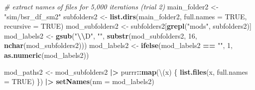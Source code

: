 \documentclass[12pt, twoside]{amherstthesis}
\newenvironment{Shaded}{\begin{snugshade}}{\end{snugshade}}
\newcommand{\AttributeTok}[1]{\textcolor[rgb]{0.13,0.29,0.53}{#1}}
\newcommand{\CommentTok}[1]{\textcolor[rgb]{0.56,0.35,0.01}{\textit{#1}}}
\newcommand{\ConstantTok}[1]{\textcolor[rgb]{0.56,0.35,0.01}{#1}}
\newcommand{\DecValTok}[1]{\textcolor[rgb]{0.00,0.00,0.81}{#1}}
\newcommand{\FunctionTok}[1]{\textcolor[rgb]{0.13,0.29,0.53}{\textbf{#1}}}
\newcommand{\NormalTok}[1]{#1}
\newcommand{\OtherTok}[1]{\textcolor[rgb]{0.56,0.35,0.01}{#1}}
\newcommand{\SpecialCharTok}[1]{\textcolor[rgb]{0.81,0.36,0.00}{\textbf{#1}}}
\newcommand{\StringTok}[1]{\textcolor[rgb]{0.31,0.60,0.02}{#1}}
\begin{document}
\begin{Shaded}
\begin{Highlighting}[]
\CommentTok{\# extract names of files for 5,000 iterations (trial 2)}
\NormalTok{main\_folder2 }\OtherTok{\textless{}{-}} \StringTok{"sim/bsr\_df\_sm2"}
\NormalTok{subfolders2 }\OtherTok{\textless{}{-}} \FunctionTok{list.dirs}\NormalTok{(main\_folder2, }\AttributeTok{full.names =} \ConstantTok{TRUE}\NormalTok{, }\AttributeTok{recursive =} \ConstantTok{TRUE}\NormalTok{)}
\NormalTok{mod\_subfolders2 }\OtherTok{\textless{}{-}}\NormalTok{ subfolders2[}\FunctionTok{grepl}\NormalTok{(}\StringTok{"mods"}\NormalTok{, subfolders2)]}
\NormalTok{mod\_labels2 }\OtherTok{\textless{}{-}} \FunctionTok{gsub}\NormalTok{(}\StringTok{"}\SpecialCharTok{\textbackslash{}\textbackslash{}}\StringTok{D"}\NormalTok{, }\StringTok{""}\NormalTok{, }\FunctionTok{substr}\NormalTok{(mod\_subfolders2, }\DecValTok{16}\NormalTok{, }\FunctionTok{nchar}\NormalTok{(mod\_subfolders2)))}
\NormalTok{mod\_labels2 }\OtherTok{\textless{}{-}} \FunctionTok{ifelse}\NormalTok{(mod\_labels2 }\SpecialCharTok{==} \StringTok{""}\NormalTok{, }\DecValTok{1}\NormalTok{, }\FunctionTok{as.numeric}\NormalTok{(mod\_labels2))}

\NormalTok{mod\_paths2 }\OtherTok{\textless{}{-}}\NormalTok{ mod\_subfolders2 }\SpecialCharTok{|\textgreater{}} 
\NormalTok{  purrr}\SpecialCharTok{::}\FunctionTok{map}\NormalTok{(\textbackslash{}(x) \{}
    \FunctionTok{list.files}\NormalTok{(x, }\AttributeTok{full.names =} \ConstantTok{TRUE}\NormalTok{)}
\NormalTok{  \}) }\SpecialCharTok{|\textgreater{}} 
  \FunctionTok{setNames}\NormalTok{(}\AttributeTok{nm =}\NormalTok{ mod\_labels2)}


\end{Highlighting}
\end{Shaded}
\end{document}

